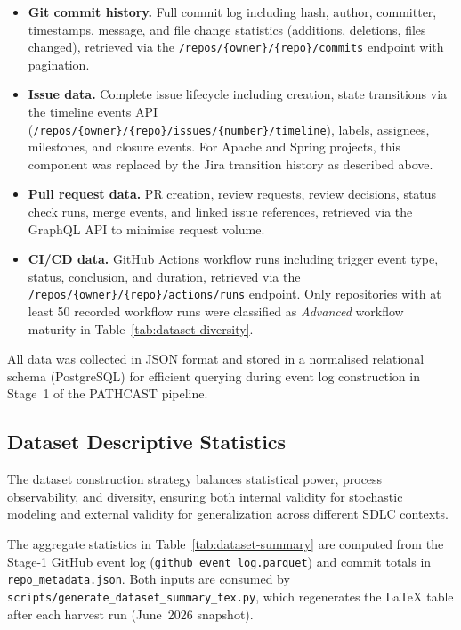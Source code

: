 \begin{itemize}
    \item \textbf{Git commit history.} Full commit log including hash,
    author, committer, timestamps, message, and file change statistics
    (additions, deletions, files changed), retrieved via the
    \texttt{/repos/\{owner\}/\{repo\}/commits} endpoint with pagination.

    \item \textbf{Issue data.} Complete issue lifecycle including
    creation, state transitions via the timeline events API
    (\texttt{/repos/\{owner\}/\{repo\}/issues/\{number\}/timeline}),
    labels, assignees, milestones, and closure events. For Apache and
    Spring projects, this component was replaced by the Jira transition
    history as described above.

    \item \textbf{Pull request data.} PR creation, review requests,
    review decisions, status check runs, merge events, and linked issue
    references, retrieved via the GraphQL API to minimise request volume.

    \item \textbf{CI/CD data.} GitHub Actions workflow runs including
    trigger event type, status, conclusion, and duration, retrieved via
    the \texttt{/repos/\{owner\}/\{repo\}/actions/runs} endpoint. Only
    repositories with at least 50 recorded workflow runs were classified
    as \textit{Advanced} workflow maturity in
    Table~\ref{tab:dataset-diversity}.
\end{itemize}

All data was collected in JSON format and stored in a normalised
relational schema (PostgreSQL) for efficient querying during event log
construction in Stage~1 of the PATHCAST pipeline.


\subsection{Dataset Descriptive Statistics}
\label{sec:dataset-stats}

The dataset construction strategy balances statistical power, process observability, and diversity, ensuring both internal validity for stochastic modeling and external validity for generalization across different SDLC contexts.

The aggregate statistics in Table~\ref{tab:dataset-summary} are computed from
the Stage-1 GitHub event log (\texttt{github\_event\_log.parquet}) and commit
totals in \texttt{repo\_metadata.json}. Both inputs are consumed by
\texttt{scripts/generate\_dataset\_summary\_tex.py}, which regenerates the
LaTeX table after each harvest run (June~2026 snapshot).

